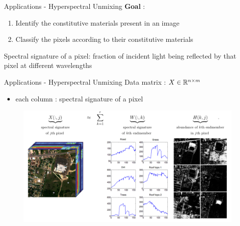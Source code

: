 \begin{frame}{Applications - Hyperspectral Unmixing}
    \textbf{Goal} :
    \begin{enumerate}
        \item Identify the constitutive materials present in an image
        \item Classify the pixels according to their constitutive materials
    \end{enumerate}
    \vspace{1cm}
    Spectral signature of a pixel: fraction of incident light being reflected by that pixel at different wavelengths\\
\end{frame}

\begin{frame}{Applications - Hyperspectral Unmixing}
    Data matrix : $X\in\mathbb{R}^{n\times m}$\\
    \begin{itemize}
        \item each column : spectral signature of a pixel
    \end{itemize}
    \begin{figure}
        \centering
        \includegraphics[width=0.85\linewidth]{NMF_app3.png}
    \end{figure}
\end{frame}